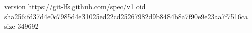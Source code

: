 version https://git-lfs.github.com/spec/v1
oid sha256:fd37d4e0c7985d4e31025ed22cd25267982d9b8484b8a7f90e9e23aa7f7516ca
size 349692
